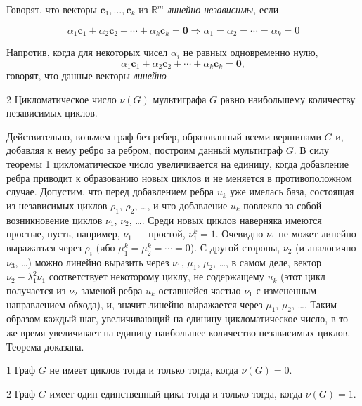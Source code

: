 Говорят, что векторы $\mathbf{c}_1, \ldots, \mathbf{c}_k$ из $\mathbb{R}^m$ \textit{линейно независимы}, если

\[\alpha_1\mathbf{c}_1 + \alpha_2\mathbf{c}_2 + \cdots + \alpha_k\mathbf{c}_k = \mathbf{0} \Rightarrow \alpha_1 = \alpha_2 = \cdots = \alpha_k = 0\]

Напротив, когда для некоторых чисел $\alpha_i$ не равных одновременно нулю,
\[\alpha_1\mathbf{c}_1 + \alpha_2\mathbf{c}_2 + \cdots + \alpha_k\mathbf{c}_k = \mathbf{0},\] говорят, что данные векторы \textit{линейно}

\begin{theorem} 2
    Цикломатическое число $\nu(G)$ мультиграфа $G$ равно наибольшему количеству независимых циклов.
    \end{theorem}
    
    Действительно, возьмем граф без ребер, образованный всеми вершинами $G$ и, добавляя к нему ребро за ребром, построим данный мультиграф $G$. В силу теоремы 1 цикломатическое число увеличивается на единицу, когда добавление ребра приводит к образованию новых циклов и не меняется в противоположном случае. Допустим, что перед добавлением ребра $u_k$ уже имелась база, состоящая из независимых циклов $\rho_1$, $\rho_2$, \ldots, и что добавление $u_k$ повлекло за собой возникновение циклов $\nu_1$, $\nu_2$, \ldots. Среди новых циклов наверняка имеются простые, пусть, например, $\nu_1$ --- простой, $\nu_1^k = 1$. Очевидно $\nu_1$ не может линейно выражаться через $\rho_i$ (ибо $\mu_1^k = \mu_2^k = \cdots = 0$). С другой стороны, $\nu_2$ (и аналогично $\nu_3$, \ldots) можно линейно выразить через $\nu_1$, $\mu_1$, $\mu_2$, \ldots, в самом деле, вектор $\nu_2 - \lambda_1^2\nu_1$ соответствует некоторому циклу, не содержащему $u_k$ (этот цикл получается из $\nu_2$ заменой ребра $u_k$ оставшейся частью $\nu_1$ с измененным направлением обхода), и, значит линейно выражается через $\mu_1$, $\mu_2$, \ldots. Таким образом каждый шаг, увеличивающий на единицу цикломатическое число, в то же время увеличивает на единицу наибольшее количество независимых циклов. Теорема доказана.
    
    \begin{corollary} 1
    Граф $G$ не имеет циклов тогда и только тогда, когда $\nu(G) = 0$.
    \end{corollary}
    
    \begin{corollary} 2
    Граф $G$ имеет один единственный цикл тогда и только тогда, когда $\nu(G) = 1$.
    \end{corollary}
    
